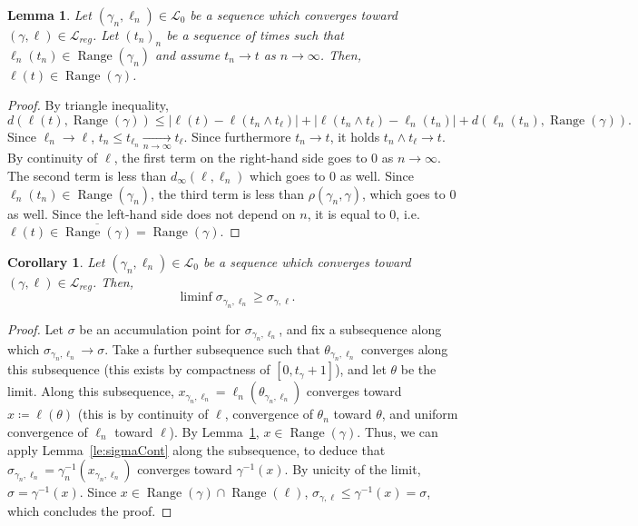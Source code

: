 \documentclass[11pt]{article}
\newtheorem{lemma}[theorem]{Lemma}
\newtheorem{corollary}[theorem]{Corollary}
\DeclareMathOperator{\Range}{Range}
\begin{document}
\begin{lemma}
    \label{le:stupidbound}
    Let  $(\gamma_n,\ell_n)\in \mathscr{L}_0 $ be a sequence which converges toward $(\gamma,\ell)\in \mathscr{L}_{reg}$.
    Let $(t_n)_n$ be a sequence of times such that $\ell_n(t_n)\in \Range(\gamma_n)$ and assume $t_n\to t$ as $n\to \infty$. Then, $\ell(t)\in\Range(\gamma )$.
\end{lemma}
\begin{proof}
    By triangle inequality,
    \[
    d(\ell(t), \Range(\gamma) )
    \leq |\ell(t)- \ell(t_n\wedge t_\ell)|+ |\ell(t_n\wedge t_\ell)- \ell_n(t_n)|+d(\ell_n(t_n), \Range(\gamma)).
    \]
  Since $\ell_n\to \ell $, $t_n\leq t_{\ell_n}\underset{n\to \infty}{\longrightarrow} t_\ell$. Since furthermore $t_n\to t$, it holds $t_n\wedge t_\ell\to t$. By continuity of $\ell$, the first term on the right-hand side goes to $0$ as $n\to \infty$. The second term is less than $d_\infty(\ell,\ell_n)$ which goes to $0$ as well. Since $\ell_n(t_n)\in \Range(\gamma_n)$, the third term is less than $\rho(\gamma_n,\gamma)$, which goes to $0$ as well. Since the left-hand side does not depend on $n$, it is equal to $0$, i.e. $\ell(t)\in \overline{\Range(\gamma)}=\Range(\gamma)$.
\end{proof}

\begin{corollary}
    \label{coro:stupidbound}
     Let  $(\gamma_n,\ell_n)\in \mathscr{L}_0 $ be a sequence which converges toward $(\gamma,\ell)\in \mathscr{L}_{reg}$.
    Then, \[\liminf \sigma_{\gamma_n,\ell_n}\geq \sigma_{\gamma,\ell}.\]
\end{corollary}
\begin{proof}
    Let $\sigma$ be an accumulation point for $\sigma_{\gamma_n,\ell_n}$, and fix a subsequence along which $\sigma_{\gamma_n,\ell_n}\to \sigma$. Take a further subsequence such that $\theta_{\gamma_n,\ell_n}$ converges along this subsequence (this exists  by compactness of $[0,t_\gamma+1]$), and let $\theta$ be the limit. Along this subsequence, $x_{\gamma_n,\ell_n}= \ell_n(\theta_{\gamma_n,\ell_n})$ converges toward $x\coloneqq \ell(\theta)$ (this is by continuity of $\ell$, convergence of $\theta_n$ toward $\theta$, and uniform convergence of $\ell_n$ toward $\ell$).
By Lemma~\ref{le:stupidbound}, $x\in \Range(\gamma)$. Thus, we can apply Lemma~\ref{le:sigmaCont} along the subsequence, to deduce that $\sigma_{\gamma_n,\ell_n}=\gamma_n^{-1}(x_{\gamma_n,\ell_n})$ converges toward $\gamma^{-1}(x)$. By unicity of the limit, $\sigma= \gamma^{-1}(x)$. Since
 $x\in \Range(\gamma)\cap \Range(\ell)$,  $\sigma_{\gamma, \ell}\leq \gamma^{-1}(x)=\sigma  $, which concludes the proof.
\end{proof}
\end{document}
